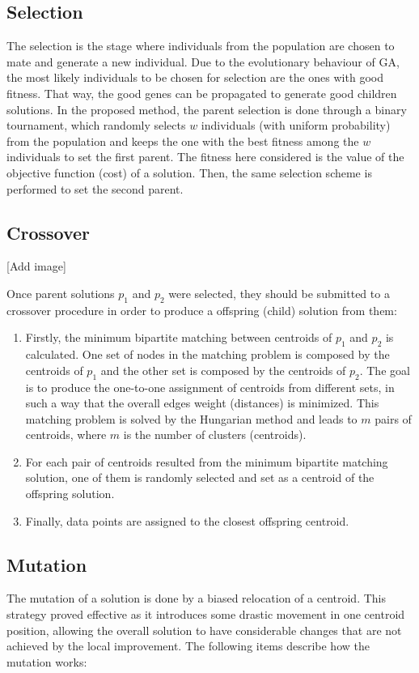 \subsection{Selection}
The selection is the stage where individuals from the population are chosen to mate and generate a new individual. Due to the evolutionary behaviour of GA, the most likely individuals to be chosen for selection are the ones with good fitness. That way, the good genes can be propagated to generate good children solutions. In the proposed method, the parent selection is done through a binary tournament, which randomly selects $w$ individuals (with uniform probability) from the population and keeps the one with the best fitness among the $w$ individuals to set the first parent. The fitness here considered is the value of the objective function (cost) of a solution. Then, the same selection scheme is performed to set the second parent.

\subsection{Crossover}
[Add image]

Once parent solutions $p_1$ and $p_2$ were selected, they should be submitted to a crossover procedure in order to produce a offspring (child) solution from them:

\begin{enumerate}
	\item Firstly, the minimum bipartite matching between centroids of $p_1$ and $p_2$ is calculated. One set of nodes in the matching problem is composed by the centroids of $p_1$ and the other set is composed by the centroids of $p_2$. The goal is to produce the one-to-one assignment of centroids from different sets, in such a way that the overall edges weight (distances) is minimized. This matching problem is solved by the Hungarian method \cite{Kuhn1955} and leads to $m$ pairs of centroids, where $m$ is the number of clusters (centroids).

	\item For each pair of centroids resulted from the minimum bipartite matching solution, one of them is randomly selected and set as a centroid of the offspring solution.

	\item Finally, data points are assigned to the closest offspring centroid.
\end{enumerate}

\subsection{Mutation}
The mutation of a solution is done by a biased relocation of a centroid. This strategy proved effective as it introduces some drastic movement in one centroid position, allowing the overall solution to have considerable changes that are not achieved by the local improvement. The following items describe how the mutation works:

